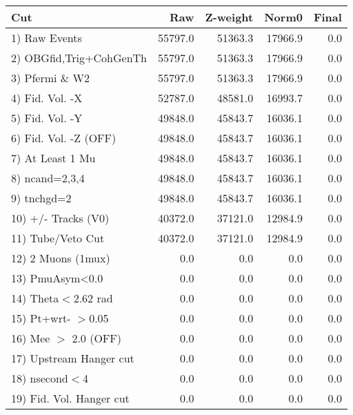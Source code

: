  \begin{table}[h!]\centering
 \begin{tabular}{||l||r|r|r|r||}
 \hline
 \hline
 Cut & Raw & Z-weight & Norm0 & Final \\
 \hline
  1) Raw Events           &     55797.0 &     51363.3 &     17966.9 &         0.0 \\
  2) OBGfid,Trig+CohGenTh &     55797.0 &     51363.3 &     17966.9 &         0.0 \\
  3) Pfermi \& W2         &     55797.0 &     51363.3 &     17966.9 &         0.0 \\
  4) Fid. Vol. -X         &     52787.0 &     48581.0 &     16993.7 &         0.0 \\
  5) Fid. Vol. -Y         &     49848.0 &     45843.7 &     16036.1 &         0.0 \\
  6) Fid. Vol. -Z (OFF)   &     49848.0 &     45843.7 &     16036.1 &         0.0 \\
  7) At Least 1 Mu        &     49848.0 &     45843.7 &     16036.1 &         0.0 \\
  8) ncand=2,3,4          &     49848.0 &     45843.7 &     16036.1 &         0.0 \\
  9) tnchgd=2             &     49848.0 &     45843.7 &     16036.1 &         0.0 \\
 10) +/- Tracks (V0)      &     40372.0 &     37121.0 &     12984.9 &         0.0 \\
 11) Tube/Veto Cut        &     40372.0 &     37121.0 &     12984.9 &         0.0 \\
 12) 2 Muons (1mux)       &         0.0 &         0.0 &         0.0 &         0.0 \\
 13) PmuAsym<0.0          &         0.0 &         0.0 &         0.0 &         0.0 \\
 14) Theta$<$2.62 rad     &         0.0 &         0.0 &         0.0 &         0.0 \\
 15) Pt+wrt- $>$0.05      &         0.0 &         0.0 &         0.0 &         0.0 \\
 16) Mee $>$ 2.0  (OFF)   &         0.0 &         0.0 &         0.0 &         0.0 \\
 17) Upstream Hanger cut  &         0.0 &         0.0 &         0.0 &         0.0 \\
 18) nsecond$<$4          &         0.0 &         0.0 &         0.0 &         0.0 \\
 19) Fid. Vol. Hanger cut &         0.0 &         0.0 &         0.0 &         0.0 \\

\end{tabular}
\end{table}
